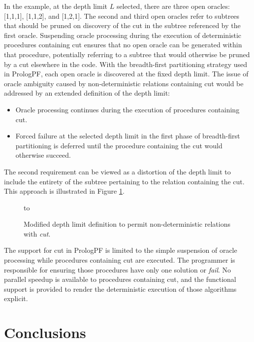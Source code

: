 In the example, at the depth limit $L$ selected, there are three open oracles: [1,1,1],
[1,1,2], and [1,2,1].  The second and third open oracles refer to subtrees that should
be pruned on discovery of the cut in the subtree referenced by the first oracle.
Suspending oracle processing during the execution of deterministic procedures containing
cut ensures that no open oracle can be generated within that procedure, potentially
referring to a subtree that would otherwise be pruned by a cut elsewhere in the code.
With the breadth-first partitioning strategy used in PrologPF, each open oracle is
discovered at the fixed depth limit.  The issue of oracle ambiguity caused by non-deterministic
relations containing cut would be addressed by an extended definition of the depth limit:
\begin{itemize}
\item{Oracle processing continues during the execution of procedures containing cut.}
\item{Forced failure at the selected depth limit in the first phase of breadth-first partitioning
  is deferred until the procedure containing the cut would otherwise succeed.}
\end{itemize}
The second requirement can be viewed as a distortion of the depth limit to include the
entirety of the subtree pertaining to the relation containing the cut.
This approach is illustrated in Figure \ref{cut_det_tree4}.

\begin{figure}[htbp]
\vspace{5mm} \hbox to 
\caption{Modified depth limit definition to permit non-deterministic relations with \textit{cut}.}
\vspace{5mm}
\label{cut_det_tree4}
\end{figure}

The support for cut in PrologPF is limited to the simple suspension of oracle processing
while procedures containing cut are executed.  The programmer is responsible for ensuring
those procedures have only one solution or \textit{fail}.  No parallel speedup is available
to procedures containing cut, and the functional support is provided to render the
deterministic execution of those algorithms explicit.

\section{Conclusions} %

